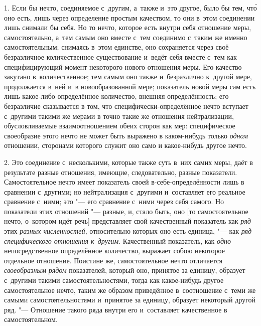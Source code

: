 1. Если бы нечто, соединяемое с~другим, а~также и~это другое, было бы тем,
чт\'{о} оно есть, лишь через определение простым качеством, то они в~этом
соединении лишь снимали бы себя. Но то нечто, которое есть внутри себя
отношение меры, самостоятельно, а~тем самым оно вместе с~тем соединимо с~таким
же именно самостоятельным; снимаясь в~этом единстве, оно сохраняется через своё
безразличное количественное существование и~ведёт себя вместе с~тем как
специфицирующий момент некоторого нового отношения меры. Его качество закутано
в~количественное; тем самым оно также и~безразлично к~другой мере, продолжается
в~ней и~в новообразованной мере; показатель новой меры сам есть лишь какое-либо
определённое количество, внешняя определённость; его безразличие сказывается в
том, что специфически-определённое нечто вступает с~другими такими же мерами в
точно такие же отношения нейтрализации, обусловливаемые взаимоотношением обеих
сторон как мер: специфическое своеобразие этого нечто не может быть выражено в
каком-нибудь только {\em одном} отношении, сторонами которого служит оно само и
какое-нибудь другое нечто.

2. Это соединение с~несколькими, которые также суть в~них самих меры, даёт в
результате разные отношения, имеющие, следовательно, разные показатели.
Самостоятельное нечто имеет показатель своей в-себе-определённости лишь в
сравнении с~другими; но нейтрализация с~другими и~составляет его реальное
сравнение с~ними; это "--- его сравнение с~ними через себя самого. Но
показатели этих отношений "--- разные, и, стало быть, оно [то самостоятельное
нечто, о~котором идёт речь] представляет свой качественный показатель как
{\em ряд} этих {\em разных численностей,} относительно которых оно есть
единица, "--- как {\em ряд специфического отношения к~другим}. Качественный
показатель, как {\em одно} непосредственное определённое количество, выражает
собою некоторое отдельное отношение. Поистине же, самостоятельное нечто
отличается {\em своеобразным рядом} показателей, который оно, принятое за
единицу, образует с~другими такими самостоятельностями, тогда как какое-нибудь
другое самостоятельное нечто, таким же образом приведённое в~соотношение с~теми
же самыми самостоятельностями и~принятое за единицу, образует некоторый другой
ряд. "--- Отношение такого ряда внутри его и~составляет качественное в
самостоятельном.

